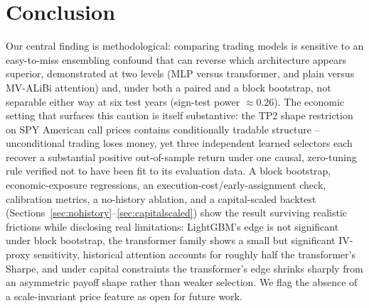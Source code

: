 \documentclass[sigconf,review]{acmart}
\begin{document}
\section{Conclusion}
Our central finding is methodological: comparing trading models is sensitive to an easy-to-miss ensembling confound that can reverse which architecture appears superior, demonstrated at two levels (MLP versus transformer, and plain versus MV-ALiBi attention) and, under both a paired and a block bootstrap, not separable either way at six test years (sign-test power $\approx0.26$). The economic setting that surfaces this caution is itself substantive: the TP2 shape restriction on SPY American call prices contains conditionally tradable structure -- unconditional trading loses money, yet three independent learned selectors each recover a substantial positive out-of-sample return under one causal, zero-tuning rule verified not to have been fit to its evaluation data. A block bootstrap, economic-exposure regressions, an execution-cost/early-assignment check, calibration metrics, a no-history ablation, and a capital-scaled backtest (Sections~\ref{sec:nohistory}--\ref{sec:capitalscaled}) show the result surviving realistic frictions while disclosing real limitations: LightGBM's edge is not significant under block bootstrap, the transformer family shows a small but significant IV-proxy sensitivity, historical attention accounts for roughly half the transformer's Sharpe, and under capital constraints the transformer's edge shrinks sharply from an asymmetric payoff shape rather than weaker selection. We flag the absence of a scale-invariant price feature as open for future work.
\end{document}
